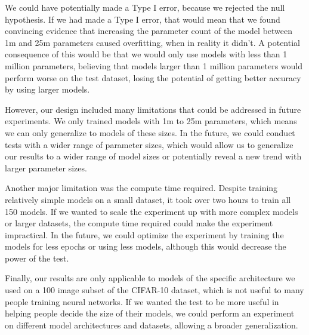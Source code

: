 \documentclass[12pt]{article}
\begin{document}
    We could have potentially made a Type I error, because we rejected the null hypothesis. If we had made a Type I error,
    that would mean that we found convincing evidence that increasing the parameter count of the model between 1m and 25m parameters
    caused overfitting, when in reality it didn't. A potential consequence of this would be that we would only use models with less than 1 million parameters,
    believing that models larger than 1 million parameters would perform worse on the test dataset, losing the potential
    of getting better accuracy by using larger models.

    However, our design included many limitations that could be addressed in future experiments.
    We only trained models with 1m to 25m parameters, which means we can only generalize to models of these sizes.
    In the future, we could conduct tests with a wider range of parameter sizes, which would allow us to generalize our results to a wider range of model sizes or potentially reveal a new trend with larger parameter sizes.

    Another major limitation was the compute time required. Despite training relatively simple models on a small dataset, it took over two hours to train all 150 models.
    If we wanted to scale the experiment up with more complex models or larger datasets, the compute time required could make the experiment impractical.
    In the future, we could optimize the experiment by training the models for less epochs or using less models, although this would decrease the power of the test.

    Finally, our results are only applicable to models of the specific architecture we used on a 100 image subset of the CIFAR-10 dataset, which is not useful to many people training neural networks.
    If we wanted the test to be more useful in helping people decide the size of their models, we could perform an experiment on different model architectures and datasets, allowing a broader generalization.



    \clearpage
    \appendix
\end{document}
